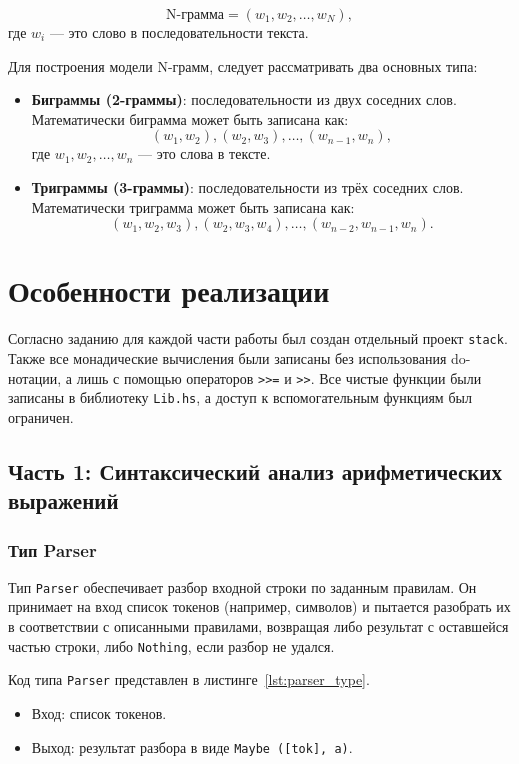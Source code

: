 \documentclass[a4paper, final]{article}
\begin{document}
\[
\text{N-грамма} = (w_1, w_2, \ldots, w_N),
\]
где \(w_i\) — это слово в последовательности текста.

Для построения модели N-грамм, следует рассматривать два основных типа:

\begin{itemize}
	\item \textbf{Биграммы (2-граммы)}: последовательности из двух соседних слов. Математически биграмма может быть записана как:
	\[
	(w_1, w_2), (w_2, w_3), \ldots, (w_{n-1}, w_n),
	\]
	где \( w_1, w_2, \ldots, w_n \) — это слова в тексте.
	\item \textbf{Триграммы (3-граммы)}: последовательности из трёх соседних слов. Математически триграмма может быть записана как:
	\[
	(w_1, w_2, w_3), (w_2, w_3, w_4), \ldots, (w_{n-2}, w_{n-1}, w_n).
	\]
\end{itemize}







\newpage
\section{Особенности реализации}
Согласно заданию для каждой части работы был создан отдельный проект \texttt{stack}. Также все монадические вычисления были записаны без использования do-нотации, а лишь с помощью операторов \texttt{>\>>=} и \texttt{>\>>}. Все чистые функции были записаны в библиотеку \texttt{Lib.hs}, а доступ к вспомогательным функциям был ограничен.

\subsection{Часть 1: Синтаксический анализ арифметических выражений}

\subsubsection{Тип Parser}
Тип \texttt{Parser} обеспечивает разбор входной строки по заданным правилам. Он принимает на вход список токенов (например, символов) и пытается разобрать их в соответствии с описанными правилами, возвращая либо результат с оставшейся частью строки, либо \texttt{Nothing}, если разбор не удался.

Код типа \texttt{Parser} представлен в листинге~\ref{lst:parser_type}.  
\begin{itemize}
	\item Вход: список токенов.
	\item Выход: результат разбора в виде \texttt{Maybe ([tok], a)}.
\end{itemize}
\end{document}
